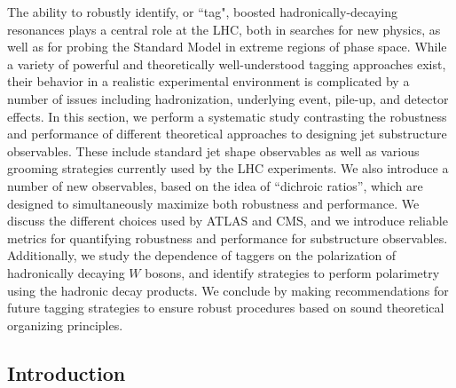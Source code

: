 \documentclass[11pt]{cernrep}
\begin{document}
The ability to robustly identify, or ``tag", boosted hadronically-decaying resonances plays a central role at the LHC, both in
  searches for new physics, as well as for probing the Standard Model
  in extreme regions of phase space.
  While a variety of powerful and
  theoretically well-understood tagging approaches exist, their behavior in a realistic experimental environment is complicated by a number of issues including hadronization, underlying event, pile-up, and detector effects.
  In this section, we perform a
  systematic study contrasting the robustness and performance of
  different theoretical approaches to designing jet substructure
  observables.
  These include standard jet shape observables as well as various grooming
  strategies currently used by the LHC experiments.
  We also introduce a number of new observables, based on the idea of
  ``dichroic ratios'', which are designed to simultaneously maximize both
  robustness and performance.
%
  We discuss
  the different choices used by ATLAS and CMS, and we introduce
  reliable metrics for quantifying robustness and performance for
  substructure observables.
  Additionally, we study the dependence of taggers on the polarization of hadronically decaying $W$ bosons, and identify strategies to perform polarimetry using the hadronic decay products.
%  
We conclude by making recommendations for future
  tagging strategies to ensure robust procedures based on sound
  theoretical organizing principles.

\subsection{Introduction}\label{jetsub_2prong_sec:intro}
\end{document}
